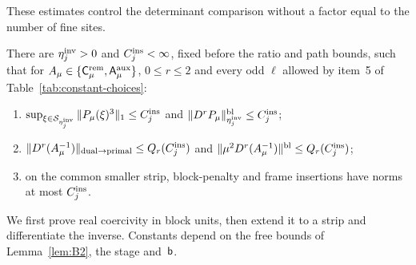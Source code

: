 These estimates control the determinant comparison without a factor equal to the number of fine sites.
\begin{lemma}\label{lem:B7}
There are $\eta_j^{\rm inv}>0$ and $C_j^{\rm ins}<\infty$, fixed before the ratio and path bounds, such that for $A_\mu\in\{\mathsf C^{\rm rem}_\mu,\mathsf A^{\rm aux}_\mu\}$, $0\le r\le2$ and every odd $\ell$ allowed by item~5 of Table~\ref{tab:constant-choices}:
\begin{enumerate}[label=(\roman*)]
\item $\sup_{\xi\in\mathcal S_{\eta_j^{\rm inv}}}\|P_\mu(\xi)^3\|_1\le C_j^{\rm ins}$ and $\|D^rP_\mu\|_{\eta_j^{\rm inv}}^{\rm bl}\le C_j^{\rm ins}$;
\item $\|D^r(A_\mu^{-1})\|_{\rm dual\to primal}\le Q_r(C_j^{\rm ins})$ and $\|\mu^2D^r(A_\mu^{-1})\|^{\rm bl}\le Q_r(C_j^{\rm ins})$;
\item on the common smaller strip, block-penalty and frame insertions have norms at most $C_j^{\rm ins}$.
\end{enumerate}
\end{lemma}
We first prove real coercivity in block units, then extend it to a strip and differentiate the inverse. Constants depend on the free bounds of Lemma~\ref{lem:B2}, the stage and~$\mathsf{b}$.
